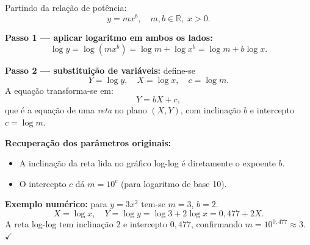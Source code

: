 Partindo da relação de potência:
\[
y=mx^b,\quad m,b\in\mathbb{R},\; x>0.
\]

\textbf{Passo 1 — aplicar logaritmo em ambos os lados:}
\[
\log y = \log(mx^b)=\log m+\log x^b = \log m + b\log x.
\]

\textbf{Passo 2 — substituição de variáveis:} define-se
\[
Y=\log y,\quad X=\log x,\quad c=\log m.
\]
A equação transforma-se em:
\[
Y=bX+c,
\]
que é a equação de uma \emph{reta} no plano $(X,Y)$, com inclinação $b$ e intercepto $c=\log m$.

\textbf{Recuperação dos parâmetros originais:}
\begin{itemize}
  \item A inclinação da reta lida no gráfico log-log é diretamente o expoente $b$.
  \item O intercepto $c$ dá $m=10^c$ (para logaritmo de base 10).
\end{itemize}

\textbf{Exemplo numérico:} para $y=3x^2$ tem-se $m=3$, $b=2$.
\[
X=\log x,\quad Y=\log y = \log 3 + 2\log x = 0{,}477 + 2X.
\]
A reta log-log tem inclinação $2$ e intercepto $0{,}477$, confirmando $m=10^{0{,}477}\approx3$. $\checkmark$

